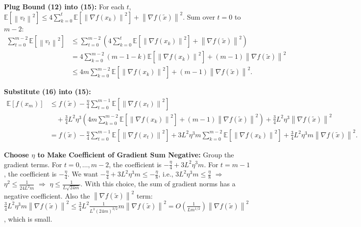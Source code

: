\documentclass{article}
\newcommand{\E}{\mathbb{E}}
\newcommand{\norm}[1]{\left\| #1 \right\|}
\newcommand{\grad}{\nabla}
\newcommand{\step}[1]{\text{\color{blue}[Step #1]}}
\begin{document}
\step{17} \textbf{Plug Bound (12) into (15):}
For each $t$, $\E[\norm{v_t}^2] \le 4 \sum_{k=0}^t \E[\norm{\grad f(x_k)}^2] + \norm{\grad f(\tilde{x})}^2$.
Sum over $t=0$ to $m-2$:
\begin{align}
    \sum_{t=0}^{m-2} \E[\norm{v_t}^2] &\le \sum_{t=0}^{m-2} \left( 4 \sum_{k=0}^t \E[\norm{\grad f(x_k)}^2] + \norm{\grad f(\tilde{x})}^2 \right) \nonumber \\
    &= 4 \sum_{k=0}^{m-2} (m-1-k) \E[\norm{\grad f(x_k)}^2] + (m-1) \norm{\grad f(\tilde{x})}^2 \nonumber \\
    &\le 4 m \sum_{k=0}^{m-2} \E[\norm{\grad f(x_k)}^2] + (m-1) \norm{\grad f(\tilde{x})}^2. \tag{16}
\end{align}

\step{18} \textbf{Substitute (16) into (15):}
\begin{align}
    \E[f(x_m)] &\le f(\tilde{x}) - \frac{\eta}{4} \sum_{t=0}^{m-1} \E[\norm{\grad f(x_t)}^2] \nonumber \\
    &\quad + \frac{3}{4} L^2 \eta^3 \left( 4 m \sum_{k=0}^{m-2} \E[\norm{\grad f(x_k)}^2] + (m-1) \norm{\grad f(\tilde{x})}^2 \right) + \frac{3}{4} L^2 \eta^3 \norm{\grad f(\tilde{x})}^2 \nonumber \\
    &= f(\tilde{x}) - \frac{\eta}{4} \sum_{t=0}^{m-1} \E[\norm{\grad f(x_t)}^2] + 3 L^2 \eta^3 m \sum_{k=0}^{m-2} \E[\norm{\grad f(x_k)}^2] + \frac{3}{4} L^2 \eta^3 m \norm{\grad f(\tilde{x})}^2. \tag{17}
\end{align}

\step{19} \textbf{Choose $\eta$ to Make Coefficient of Gradient Sum Negative:}
Group the gradient terms. For $t=0,\dots,m-2$, the coefficient is $-\frac{\eta}{4} + 3 L^2 \eta^3 m$.
For $t=m-1$, the coefficient is $-\frac{\eta}{4}$.
We want $-\frac{\eta}{4} + 3 L^2 \eta^3 m \le -\frac{\eta}{8}$, i.e., $3 L^2 \eta^3 m \le \frac{\eta}{8}$ $\Rightarrow$ $\eta^2 \le \frac{1}{24 L^2 m}$ $\Rightarrow$ $\eta \le \frac{1}{L \sqrt{24 m}}$.
With this choice, the sum of gradient norms has a negative coefficient.
Also the $\norm{\grad f(\tilde{x})}^2$ term: $\frac{3}{4} L^2 \eta^3 m \norm{\grad f(\tilde{x})}^2 \le \frac{3}{4} L^2 \frac{1}{L^3 (24 m)^{3/2}} m \norm{\grad f(\tilde{x})}^2 = O(\frac{1}{L m^{1/2}}) \norm{\grad f(\tilde{x})}^2$, which is small.
\end{document}

